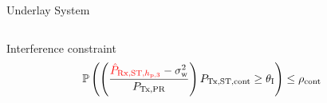\documentclass[16pt]{beamer}
\begin{document}
\begin{frame}[t]{Underlay System}
\begin{columns}
\begin{column}{0.62\columnwidth}
\begin{center}
\begin{overlayarea}{\textwidth}{4.65cm}
{{				}
			}
			\end{overlayarea}
			\end{center}
			{
				\begin{block}{\footnotesize Interference constraint}
				\vspace{-2.mm}	
					\begin{align*}		
						\p\left( \left( \frac{{\color{red}{\eprcvdstpr}} - \nps}{\ptran}\right) \preg \ge \ite \right) &\le \opc %
                                \end{align*} 
               		 	\end{block}
			} 
		\end{column}
	\end{columns}
\end{frame}
\end{document}

